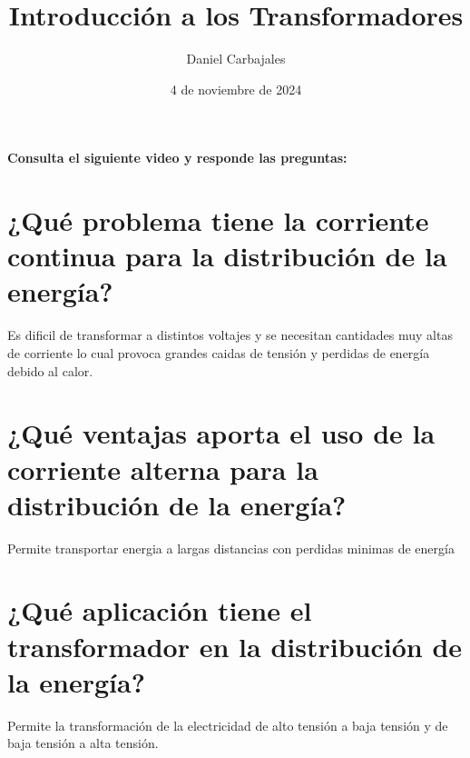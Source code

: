 \documentclass{report}
\title{\Huge{Introducción a los Transformadores}}
\author{\large{Daniel Carbajales}}
\date{4 de noviembre de 2024}
\begin{document}

\begin{huge}
  \textbf{{Consulta el siguiente video y responde las preguntas:}}\label{chapter:1}
\end{huge}
\setcounter{chapter}{1}
\vspace{1em}
\section{¿Qué problema tiene la corriente continua para la distribución de la energía?}
  Es dificil de transformar a distintos voltajes y se necesitan cantidades muy altas de corriente lo cual provoca grandes caidas de tensión y 
  perdidas de energía debido al calor.
\section{¿Qué ventajas aporta el uso de la corriente alterna para la distribución de la energía?}
  Permite transportar energia a largas distancias con perdidas minimas de energía 
\section{¿Qué aplicación tiene el transformador en la distribución de la energía?}
  Permite la transformación de la electricidad de alto tensión a baja tensión y de baja tensión a alta tensión.
\end{document}
